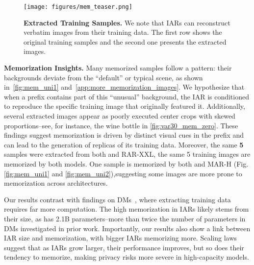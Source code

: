 \label{sec:mem_results}
\begin{figure}[h]
\centering
    \texttt{[image: figures/mem\_teaser.png]}
    \caption{\textbf{Extracted Training Samples.} We note that IARs can reconstruct verbatim images from their training data. The first row shows the original training samples and the second one presents the extracted images.}
    \label{fig:mem_main}
\end{figure}


\textbf{Memorization Insights.} Many memorized samples follow a pattern: their backgrounds deviate from the “default” or typical scene, as shown in~\cref{fig:mem_uni1} and~\cref{app:more_memorization_images}.
We hypothesize that when a prefix contains part of this “unusual” background, the IAR is conditioned to reproduce the specific training image that originally featured it.
Additionally, several extracted images appear as poorly executed center crops with skewed proportions--see, for instance, the wine bottle in \cref{fig:var30_mem_zero}. These findings suggest memorization is driven by distinct visual cues in the prefix and can lead to the generation of replicas of its training data.
Moreover, the same \textbf{5} samples were extracted from both \varbig and RAR-XXL, \ie the same 5 training images are memorized by both models. One sample is memorized by both \varbig and MAR-H (Fig. \ref{fig:mem_uni1} and \ref{fig:mem_uni2}),suggesting some images are more prone to memorization across architectures.

Our results contrast with findings on DMs~\citep{carlini2023extracting}, where extracting training data requires far more computation. The high memorization in IARs likely stems from their size, as \varbig has 2.1B parameters--more than twice the number of parameters in DMs investigated in prior work. Importantly, our results also show a link between IAR size and memorization, with bigger IARs memorizing more.
Scaling laws suggest that as IARs grow larger, their performance improves, but so does their tendency to memorize, making privacy risks more severe in high-capacity models.

